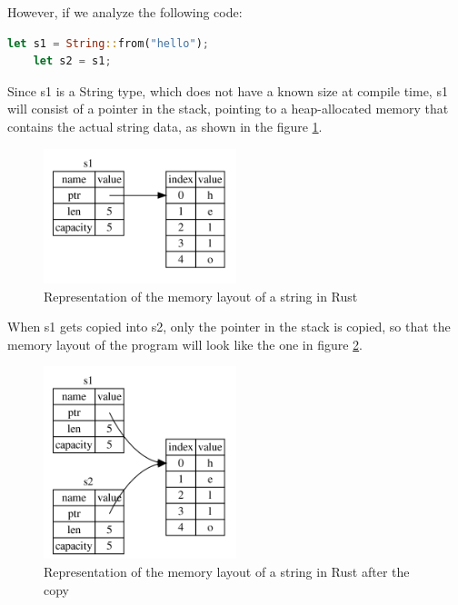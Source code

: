 However, if we analyze the following code:

\begin{lstlisting}[language=Rust]
    let s1 = String::from("hello");
    let s2 = s1;
\end{lstlisting}

Since s1 is a String type, which does not have a known size at compile time, s1 will consist of a pointer in the stack, pointing to a heap-allocated memory that contains the actual string data, as shown in the figure \ref{fig:string-memory-rep}.

\begin{figure}[h]
    \centering
    \includegraphics[width=0.5\textwidth]{figures/string-memory-rep.png}
    \caption{Representation of the memory layout of a string in Rust}
    \label{fig:string-memory-rep}
\end{figure}

When s1 gets copied into s2, only the pointer in the stack is copied, so that the memory layout of the program will look like the one in figure \ref{fig:string-memory-rep2}.

\begin{figure}[h]
    \centering
    \includegraphics[width=0.5\textwidth]{figures/string-memory-rep-2.png}
    \caption{Representation of the memory layout of a string in Rust after the copy}
    \label{fig:string-memory-rep2}
\end{figure}

